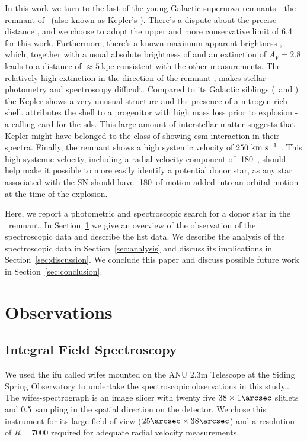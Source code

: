\documentclass[preprint2]{aastex}
\begin{document}
In this work we turn to the last of the young Galactic supernova remnants - the remnant of \ (also known as Kepler's \sn). There's a dispute about the precise distance \citep[$4-6.4$\,\kpc; see][and references therein]{2012A&A...537A.139C}, and we choose to adopt the upper and more conservative limit of 6.4~\kpc\ \citep{1999AJ....118..926R} for this work. Furthermore, there's a known maximum apparent brightness \citep[V=-3;][]{1971SvA....14..798P}, which, together with a usual absolute brightness of \sneia \citep[$M_V=19.3$;][]{2011ApJ...732..129R} and an extinction of $A_V=2.8$ leads to a distance of $\approx 5~\textrm{kpc}$ consistent with the other measurements. The relatively high extinction in the direction of the remnant \citep[$A_V=2.8$, ][]{2007ApJ...668L.135R}, makes stellar photometry and spectroscopy difficult. Compared to its Galactic siblings (\ and ) the Kepler \snr shows a very unusual structure and the presence of a nitrogen-rich shell.  \citet{2012A&A...537A.139C} attributes the shell to a progenitor with high mass loss prior to explosion - a calling card for the \gls{sds}. This large amount of interstellar matter suggests that Kepler might have belonged to the class of \sneia showing \gls{csm} interaction in their spectra. Finally, the remnant shows a high systemic velocity of  $250~\textrm{km}~\textrm{s}^{-1}$ \citep{1991ApJ...366..484B,2003A&A...407..249S}. This high systemic velocity, including a radial velocity component of -180~\kms , should help make it possible to more easily identify a potential donor star, as any star associated with the SN should have -180~\kms of motion added into an orbital motion at the time of the explosion.



Here, we report a photometric and spectroscopic search for a donor star in the \ remnant. In Section~\ref{sec:observations} we give an overview of the observation of the spectroscopic data and describe the \gls{hst} data. We describe the analysis of the spectroscopic data in Section~\ref{sec:analysis} and discuss its implications in Section~\ref{sec:discussion}. We conclude this paper and discuss possible future work in Section~\ref{sec:conclusion}.


\section{Observations}
\label{sec:observations}
\subsection{Integral Field Spectroscopy}
We used the \gls{ifu} called \gls{wifes} mounted on the ANU 2.3m Telescope at the Siding Spring Observatory  to undertake the spectroscopic observations in this study.. The \gls{wifes}-spectrograph is an image slicer with twenty five $38\times 1\arcsec$ slitlets and 0.5\arcsec\ sampling in the spatial direction on the detector. We chose this instrument for its large field of view ($25\arcsec\times38\arcsec$) and a resolution of $R=7000$ required for adequate radial velocity measurements. 
\end{document}
